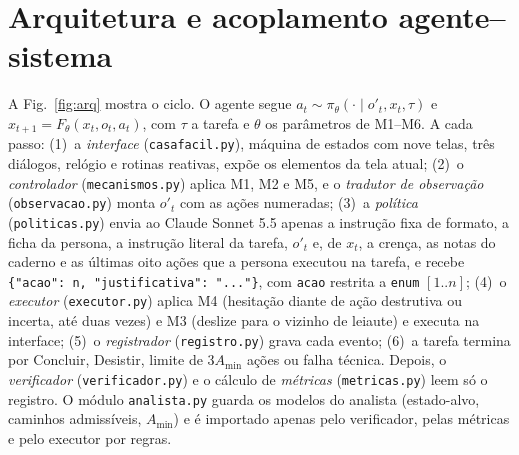 \documentclass[conference]{IEEEtran}
\begin{document}
\section{Arquitetura e acoplamento agente--sistema}
A Fig.~\ref{fig:arq} mostra o ciclo. O agente segue $a_t \sim \pi_\theta(\cdot \mid o'_t, x_t, \tau)$ e $x_{t+1} = F_\theta(x_t, o_t, a_t)$, com $\tau$ a tarefa e $\theta$ os parâmetros de M1--M6. A cada passo:
(1)~a \textit{interface} (\texttt{casafacil.py}), máquina de estados com nove telas, três diálogos, relógio e rotinas reativas, expõe os elementos da tela atual;
(2)~o \textit{controlador} (\texttt{mecanismos.py}) aplica M1, M2 e M5, e o \textit{tradutor de observação} (\texttt{observacao.py}) monta $o'_t$ com as ações numeradas;
(3)~a \textit{política} (\texttt{politicas.py}) envia ao Claude Sonnet 5.5 apenas a instrução fixa de formato, a ficha da persona, a instrução literal da tarefa, $o'_t$ e, de $x_t$, a crença, as notas do caderno e as últimas oito ações que a persona executou na tarefa, e recebe \texttt{\{"acao": n, "justificativa": "..."\}}, com \texttt{acao} restrita a \texttt{enum} $[1..n]$;
(4)~o \textit{executor} (\texttt{executor.py}) aplica M4 (hesitação diante de ação destrutiva ou incerta, até duas vezes) e M3 (deslize para o vizinho de leiaute) e executa na interface;
(5)~o \textit{registrador} (\texttt{registro.py}) grava cada evento;
(6)~a tarefa termina por Concluir, Desistir, limite de $3A_{\min}$ ações ou falha técnica. Depois, o \textit{verificador} (\texttt{verificador.py}) e o cálculo de \textit{métricas} (\texttt{metricas.py}) leem só o registro. O módulo \texttt{analista.py} guarda os modelos do analista (estado-alvo, caminhos admissíveis, $A_{\min}$) e é importado apenas pelo verificador, pelas métricas e pelo executor por regras.
\end{document}
